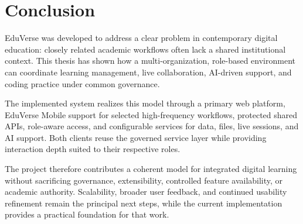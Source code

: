 \chapter*{Conclusion}\label{chap:conclusion}

EduVerse was developed to address a clear problem in contemporary digital
education: closely related academic workflows often lack a shared institutional
context. This thesis has shown how a multi-organization, role-based environment
can coordinate learning management, live collaboration, AI-driven support, and
coding practice under common governance.

The implemented system realizes this model through a primary web platform,
EduVerse Mobile support for selected high-frequency workflows, protected shared
APIs, role-aware access, and configurable services for data, files, live
sessions, and AI support. Both clients reuse the governed service layer while
providing interaction depth suited to their respective roles.

The project therefore contributes a coherent model for integrated digital
learning without sacrificing governance, extensibility, controlled feature
availability, or academic authority. Scalability, broader user feedback, and
continued usability refinement remain the principal next steps, while the
current implementation provides a practical foundation for that work.
